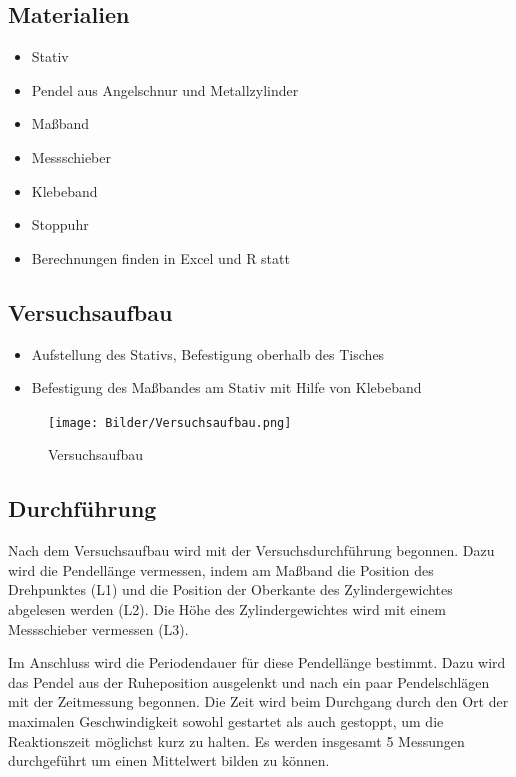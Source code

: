 \documentclass[
  9pt,
]{article}
\providecommand{\tightlist}{%
  \setlength{\itemsep}{0pt}\setlength{\parskip}{0pt}}
\begin{document}
\hypertarget{materialien}{%
\subsection{Materialien}\label{materialien}}

\begin{itemize}
\tightlist
\item
  Stativ
\item
  Pendel aus Angelschnur und Metallzylinder
\item
  Maßband
\item
  Messschieber
\item
  Klebeband
\item
  Stoppuhr
\item
  Berechnungen finden in Excel und R statt
\end{itemize}

\hypertarget{versuchsaufbau}{%
\subsection{Versuchsaufbau}\label{versuchsaufbau}}

\begin{itemize}
\tightlist
\item
  Aufstellung des Stativs, Befestigung oberhalb des Tisches
\item
  Befestigung des Maßbandes am Stativ mit Hilfe von Klebeband
\end{itemize}

\begin{figure}
\centering
\texttt{[image: Bilder/Versuchsaufbau.png]}
\caption{Versuchsaufbau}
\end{figure}

\hypertarget{durchfuxfchrung}{%
\subsection{Durchführung}\label{durchfuxfchrung}}

Nach dem Versuchsaufbau wird mit der Versuchsdurchführung begonnen. Dazu
wird die Pendellänge vermessen, indem am Maßband die Position des
Drehpunktes (L1) und die Position der Oberkante des Zylindergewichtes
abgelesen werden (L2). Die Höhe des Zylindergewichtes wird mit einem
Messschieber vermessen (L3).

Im Anschluss wird die Periodendauer für diese Pendellänge bestimmt. Dazu
wird das Pendel aus der Ruheposition ausgelenkt und nach ein paar
Pendelschlägen mit der Zeitmessung begonnen. Die Zeit wird beim
Durchgang durch den Ort der maximalen Geschwindigkeit sowohl gestartet
als auch gestoppt, um die Reaktionszeit möglichst kurz zu halten. Es
werden insgesamt 5 Messungen durchgeführt um einen Mittelwert bilden zu
können.
\end{document}
